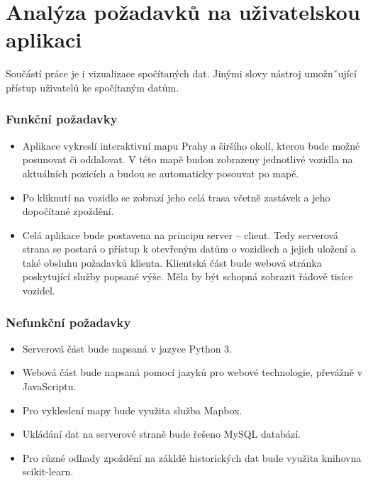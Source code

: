 \section{Analýza požadavků na uživatelskou aplikaci}

Součástí práce je i vizualizace spočítaných dat. Jinými slovy nástroj umožnˇující přístup uživatelů ke spočítaným datům.

\subsubsection{Funkční požadavky}

\begin{itemize}
	\item Aplikace vykreslí interaktivní mapu Prahy a širšího okolí, kterou bude možné posunovat či oddalovat. V této mapě budou zobrazeny jednotlivé vozidla na aktuálních pozicích a budou se automaticky posouvat po mapě.

	\item Po kliknutí na vozidlo se zobrazí jeho celá trasa včetně zastávek a jeho dopočítané zpoždění.

	\item Celá aplikace bude postavena na principu server -- client. Tedy serverová strana se postará o přístup k otevřeným datům o vozidlech a jejich uložení a také obsluhu požadavků klienta. Klientská část bude webová stránka poskytující služby popsané výše. Měla by být schopná zobrazit řádově tisíce vozidel.
\end{itemize}

\subsubsection{Nefunkční požadavky}

\begin{itemize}
	\item Serverová část bude napsaná v jazyce Python 3.

	\item Webová část bude napsaná pomocí jazyků pro webové technologie, převážně v JavaScriptu.

	\item Pro vykleslení mapy bude využita služba Mapbox.

	\item Ukládání dat na serverové straně bude řešeno MySQL databází.

	\item Pro různé odhady zpoždění na zákldě historických dat bude využita knihovna scikit-learn.

\end{itemize}

